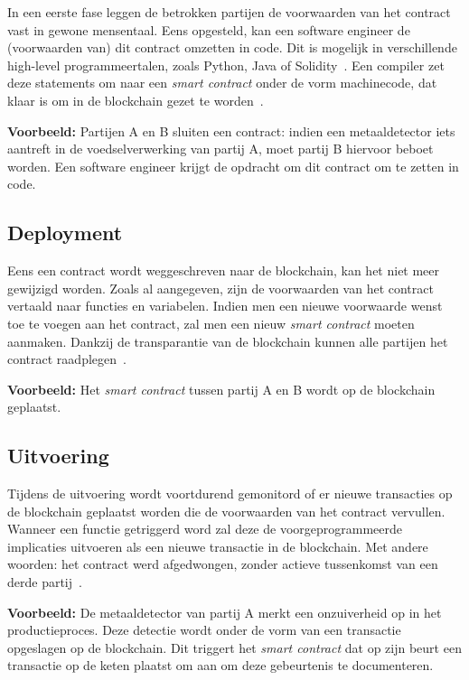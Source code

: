 In een eerste fase leggen de betrokken partijen de voorwaarden van het contract vast in gewone mensentaal. Eens opgesteld, kan een software engineer de (voorwaarden van) dit contract omzetten in code. Dit is mogelijk in verschillende high-level programmeertalen, zoals Python, Java of Solidity~\autocite{Bahga2016}. Een compiler zet deze statements om naar een \textit{smart contract} onder de vorm machinecode, dat klaar is om in de blockchain gezet te worden~\autocite{Zheng2019}.

\textbf{Voorbeeld:}
Partijen A en B sluiten een contract: indien een metaaldetector iets aantreft in de voedselverwerking van partij A, moet partij B hiervoor beboet worden. Een software engineer krijgt de opdracht om dit contract om te zetten in code.

\subsection{Deployment}

Eens een contract wordt weggeschreven naar de blockchain, kan het niet meer gewijzigd worden. Zoals al aangegeven, zijn de voorwaarden van het contract vertaald naar functies en variabelen. Indien men een nieuwe voorwaarde wenst toe te voegen aan het contract, zal men een nieuw \textit{smart contract} moeten aanmaken. Dankzij de transparantie van de blockchain kunnen alle partijen het contract raadplegen~\autocite{Zheng2019}.

\textbf{Voorbeeld:}
Het \textit{smart contract} tussen partij A en B wordt op de blockchain geplaatst.

\subsection{Uitvoering}

Tijdens de uitvoering wordt voortdurend gemonitord of er nieuwe transacties op de blockchain geplaatst worden die de voorwaarden van het contract vervullen. Wanneer een functie getriggerd word zal deze de voorgeprogrammeerde implicaties uitvoeren als een nieuwe transactie in de blockchain. Met andere woorden: het contract werd afgedwongen, zonder actieve tussenkomst van een derde partij~\autocite{Delmolino2016}.

\textbf{Voorbeeld:}
De metaaldetector van partij A merkt een onzuiverheid op in het productieproces. Deze detectie wordt onder de vorm van een transactie opgeslagen op de blockchain. Dit triggert het \textit{smart contract} dat op zijn beurt een transactie op de keten plaatst om aan om deze gebeurtenis te documenteren.

